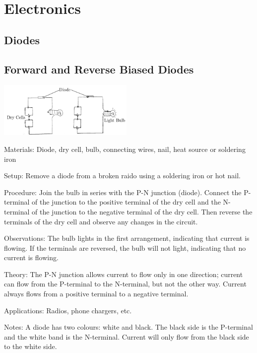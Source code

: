\section{Electronics}

\begin{multicols}{2}


\section*{Diodes}


\subsection{Forward and Reverse Biased Diodes}

\begin{center}
\includegraphics[width=0.49\textwidth]{./img/diode.png}
\end{center}

\begin{description*}
\item[Materials:]{Diode, dry cell, bulb, connecting wires, nail, heat source or soldering iron}
\item[Setup:]{Remove a diode from a broken raido using a soldering iron or hot nail.}
\item[Procedure:]{Join the bulb in series with the P-N junction (diode). Connect the P-terminal of the junction to the positive terminal of the dry cell and the N-terminal of the junction to the negative terminal of the dry cell. Then reverse the terminals of the dry cell and observe any changes in the circuit.}
\item[Observations:]{The bulb lights in the first arrangement, indicating that current is flowing. If the terminals are reversed, the bulb will not light, indicating that no current is flowing.}
\item[Theory:]{The P-N junction allows current to flow only in one direction; current can flow from the P-terminal to the N-terminal, but not the other way. Current always flows from a positive terminal to a negative terminal.}
\item[Applications:]{Radios, phone chargers, etc.}
\item[Notes:]{A diode has two colours: white and black. The black side is the P-terminal and the white band is the N-terminal. Current will only flow from the black side to the white side.}
\end{description*}


\end{multicols}
